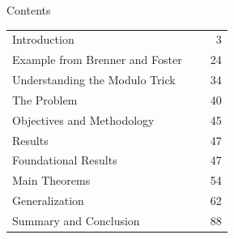 \maketitle

\begin{frame}{Contents}
    \small
    \begin{tabular}{@{}p{0.82\linewidth}r@{}}
        Introduction & 3 \\
        Example from Brenner and Foster & 24 \\
        Understanding the Modulo Trick & 34 \\
        The Problem & 40 \\
        Objectives and Methodology & 45 \\
        Results & 47 \\
        \hspace{1em}Foundational Results & 47 \\
        \hspace{1em}Main Theorems & 54 \\
        \hspace{1em}Generalization & 62 \\
        Summary and Conclusion & 88 \\
    \end{tabular}
\end{frame}

